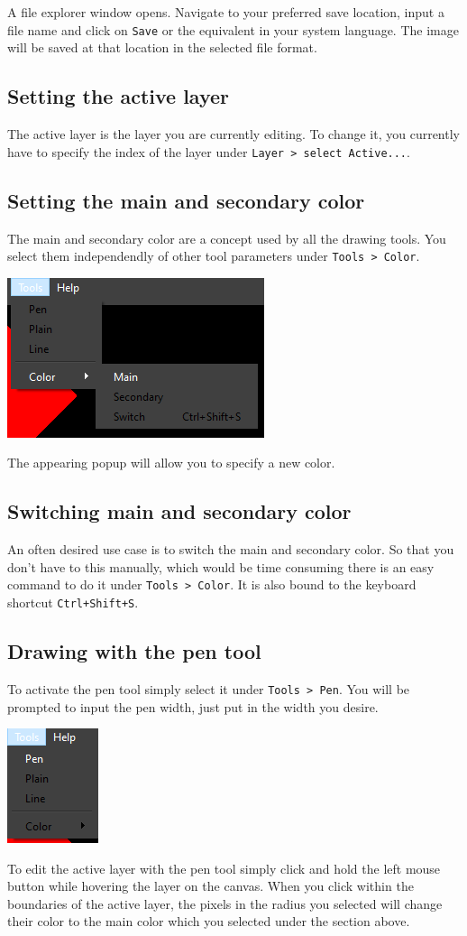 \documentclass[a4paper, 12pt]{article}
\begin{document}
A file explorer window opens. Navigate to your preferred save location, input a file name and click on \texttt{Save} or the equivalent in your system language. The image will be saved at that location in the selected file format.

\subsection{Setting the active layer}
The active layer is the layer you are currently editing. To change it, you currently have to specify the index of the layer under \texttt{Layer > select Active...}.

\subsection{Setting the main and secondary color}
The main and secondary color are a concept used by all the drawing tools. You select them independendly of other tool parameters under \texttt{Tools > Color}.
\begin{center}
\includegraphics[width=0.3\linewidth,keepaspectratio]{assets/change-colors}
\end{center}
The appearing popup will allow you to specify a new color.

\subsection{Switching main and secondary color}
An often desired use case is to switch the main and secondary color. So that you don't have to this manually, which would be time consuming there is an easy command to do it under \texttt{Tools > Color}.
It is also bound to the keyboard shortcut \texttt{Ctrl+Shift+S}.

\subsection{Drawing with the pen tool}
To activate the pen tool simply select it under \texttt{Tools > Pen}. You will be prompted to input the pen width, just put in the width you desire.
\begin{center}
\includegraphics[width=0.2\linewidth,keepaspectratio]{assets/tool-pen}
\end{center}
To edit the active layer with the pen tool simply click and hold the left mouse button while hovering the layer on the canvas. When you click within the boundaries of the active layer, the pixels in the radius you selected will change their color to the main color which you selected under the section above.
\end{document}
